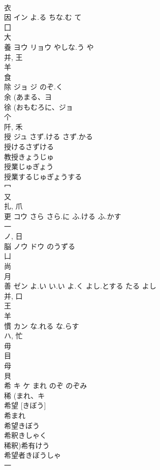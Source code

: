\documentclass[8pt]{extreport}
\begin{document}
\begin{CJK}{UTF8}{min}
\\	衣 
\\	因	イン	よ.る ちな.む て	
\\	囗 
\\	大 
\\	養	ヨウ リョウ	やしな.う や	
\\	并, 王 
\\	羊 
\\	食 
\\	除	ジョ ジ	のぞ.く	
\\	余 (あまる、ヨ 
\\	徐 (おもむろに、ジョ 
\\	个 
\\	阡, 禾 
\\	授	ジュ	さず.ける さず.かる	
\\	授けるさずける
\\	教授きょうじゅ
\\	授業じゅぎょう
\\	授業するじゅぎょうする
\\	冖 
\\	又 
\\	扎, 爪 
\\	更	コウ	さら さら.に ふ.ける ふ.かす	
\\	一 
\\	ノ, 日 
\\	脳	ノウ ドウ	のうずる	
\\	凵 
\\	尚 
\\	月 
\\	善	ゼン	よ.い い.い よ.く よし.とする たる よし	
\\	并, 口 
\\	王 
\\	羊 
\\	慣	カン	な.れる な.らす	
\\	ハ, 忙 
\\	毋 
\\	目 
\\	母 
\\	貝 
\\	希	キ ケ	まれ のぞ のぞみ	
\\	稀 (まれ、キ 
\\	希望 [きぼう] 
\\	希まれ
\\	希望きぼう
\\	希釈きしゃく
\\	稀釈)希有けう
\\	希望者きぼうしゃ
\\	一 

\end{CJK}
\end{document}
